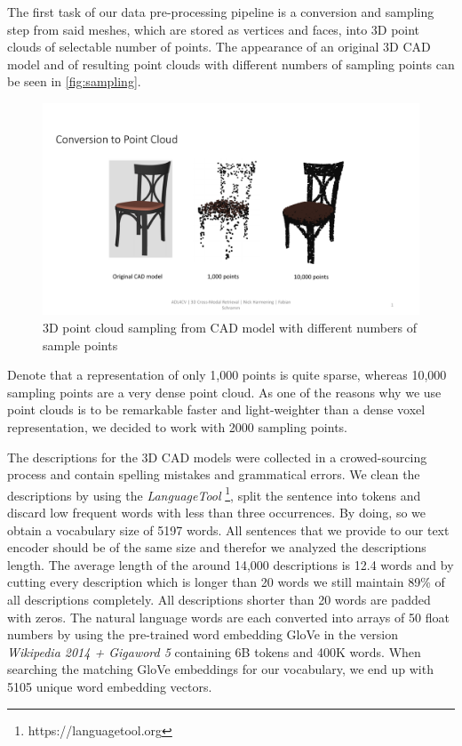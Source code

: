 \documentclass[10pt,twocolumn,letterpaper]{article}
\begin{document}
The first task of our data pre-processing pipeline is a conversion and sampling step from said meshes, which are stored as vertices and faces, into 3D point clouds of selectable number of points. The appearance of an original 3D CAD model and of resulting point clouds with different numbers of sampling points can be seen in \autoref{fig:sampling}.
\begin{figure}[t]%
	\centering
	\includegraphics[width=0.8\linewidth]{fig2.pdf}
	\caption[]{3D point cloud sampling from CAD model with different numbers of sample points}
	\label{fig:sampling}
\end{figure}
Denote that a representation of only 1,000 points is quite sparse, whereas 10,000 sampling points are a very dense point cloud. As one of the reasons why we use point clouds is to be remarkable faster and light-weighter than a dense voxel representation, we decided to work with 2000 sampling points. 

The descriptions for the 3D CAD models were collected in a crowed-sourcing process and contain spelling mistakes and grammatical errors. We clean the descriptions by using the \textit{LanguageTool} \footnote{https://languagetool.org}, split the sentence into tokens and discard low frequent words with less than three occurrences. By doing, so we obtain a vocabulary size of 5197 words. All sentences that we provide to our text encoder should be of the same size and therefor we analyzed the descriptions length. The average length of the around 14,000 descriptions is 12.4 words and by cutting every description which is longer than 20 words we still maintain 89\% of all descriptions completely. All descriptions shorter than 20 words are padded with zeros. The natural language words are each converted into arrays of 50 float numbers by using the pre-trained word embedding GloVe \cite{pennington2014glove} in the version \textit{Wikipedia 2014 + Gigaword 5} containing 6B tokens and 400K words. When searching the matching GloVe embeddings for our vocabulary, we end up with 5105 unique word embedding vectors.
\end{document}
